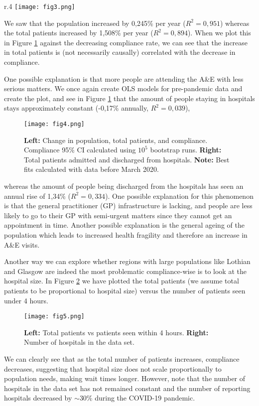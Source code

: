 \documentclass[12pt,a4paper]{article}
\begin{document}
\begin{wrapfigure}{r}{.4\linewidth}
    \centering
    \texttt{[image: fig3.png]}
    \caption{Total patients seen per NHS board between 2007 and 2022.}
    \label{fig:fig3}
    \vspace{-2em}
\end{wrapfigure}
We saw that the population increased by 0,245\% per year ($R^2 = 0,951$) whereas the total patients increased by 1,508\% per year ($R^2 = 0,894$). When we plot this in Figure \ref{fig:fig4} against the decreasing compliance rate, we can see that the increase in total patients is (not necessarily causally) correlated with the decrease in compliance. 

One possible explanation is that more people are attending the A\&E with less serious matters. We once again create OLS models for pre-pandemic data and create the plot, and see in Figure \ref{fig:fig4} that the amount of people staying in hospitals stays approximately constant (-0,17\% annually, $R^2 = 0,039$),
\begin{figure}[h]
    \centering
    \texttt{[image: fig4.png]}
    \caption{\textbf{Left:} Change in population, total patients, and compliance. Compliance 95\% CI calculated using $10^5$ bootstrap runs. \textbf{Right:} Total patients admitted and discharged from hospitals. \textbf{Note:} Best fits calculated with data before March 2020.}
    \label{fig:fig4}
\end{figure}
whereas the amount of people being discharged from the hospitals has seen an annual rise of 1,34\% ($R^2 = 0,334$). One possible explanation for this phenomenon is that the general practitioner (GP) infrastructure is lacking, and people are less likely to go to their GP with semi-urgent matters since they cannot get an appointment in time. Another possible explanation is the general ageing of the population which leads to increased health fragility and therefore an increase in A\&E visits.

Another way we can explore whether regions with large populations like Lothian and Glasgow are indeed the most problematic compliance-wise is to look at the hospital size. In Figure \ref{fig:fig5} we have plotted the total patients (we assume total patients to be proportional to hospital size) versus the number of patients seen under 4 hours. 
\begin{figure}[h]
    \centering
    \texttt{[image: fig5.png]}
    \caption{\textbf{Left:} Total patients vs patients seen within 4 hours. \textbf{Right:} Number of hospitals in the data set.}
    \label{fig:fig5}
\end{figure}
We can clearly see that as the total number of patients increases, compliance decreases, suggesting that hospital size does not scale proportionally to population needs, making wait times longer. However, note that the number of hospitals in the data set has not remained constant and the number of reporting hospitals decreased by $\sim$30\% during the COVID-19 pandemic.
\end{document}
